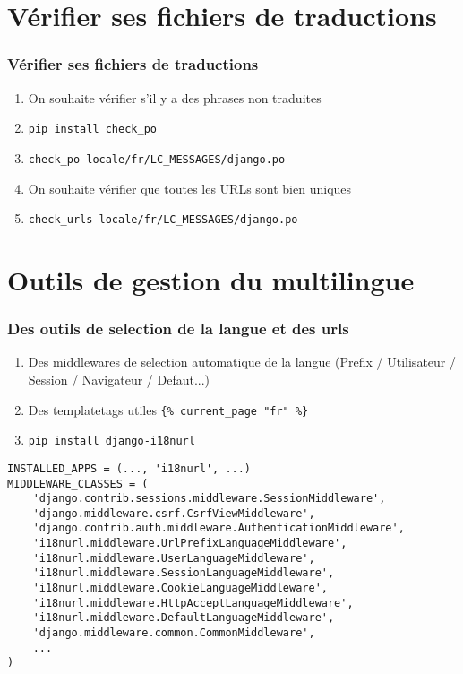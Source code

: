 \documentclass{beamer}
\begin{document}
\section{Vérifier ses fichiers de traductions}
\begin{frame}
  \frametitle{Vérifier ses fichiers de traductions}

  \begin{enumerate}
    \item On souhaite vérifier s'il y a des phrases non traduites
    \pause \item \texttt{pip install check\_po}
    \pause \item \texttt{check\_po locale/fr/LC\_MESSAGES/django.po}
    \pause \item On souhaite vérifier que toutes les URLs sont bien uniques
    \pause \item \texttt{check\_urls locale/fr/LC\_MESSAGES/django.po}
  \end{enumerate}
\end{frame}

\section{Outils de gestion du multilingue}

\begin{frame}[fragile]
  \frametitle{Des outils de selection de la langue et des urls}
  \begin{enumerate}
    \item Des middlewares de selection automatique de la langue (Prefix / Utilisateur / Session / Navigateur / Defaut...)
    \pause \item Des templatetags utiles \pause \texttt{\{\% current\_page "fr" \%\}}
    \pause \item \texttt{pip install django-i18nurl}
  \end{enumerate}
\pause

  \begin{lstlisting}
INSTALLED_APPS = (..., 'i18nurl', ...)
MIDDLEWARE_CLASSES = (
    'django.contrib.sessions.middleware.SessionMiddleware',
    'django.middleware.csrf.CsrfViewMiddleware',
    'django.contrib.auth.middleware.AuthenticationMiddleware',
    'i18nurl.middleware.UrlPrefixLanguageMiddleware',
    'i18nurl.middleware.UserLanguageMiddleware',
    'i18nurl.middleware.SessionLanguageMiddleware',
    'i18nurl.middleware.CookieLanguageMiddleware',
    'i18nurl.middleware.HttpAcceptLanguageMiddleware',
    'i18nurl.middleware.DefaultLanguageMiddleware',
    'django.middleware.common.CommonMiddleware',
    ...
)
  \end{lstlisting}

\end{frame}
\end{document}
